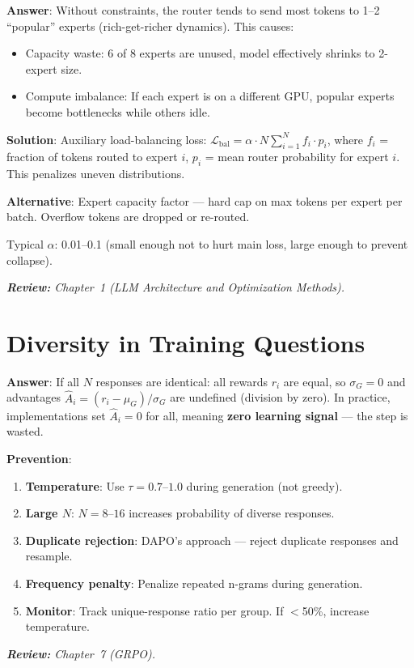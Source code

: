 \begin{questionbox}
\textbf{Answer}: Without constraints, the router tends to send most tokens to 1--2 ``popular'' experts (rich-get-richer dynamics). This causes:

\begin{itemize}
  \item Capacity waste: 6 of 8 experts are unused, model effectively shrinks to 2-expert size.
  \item Compute imbalance: If each expert is on a different GPU, popular experts become bottlenecks while others idle.
\end{itemize}

\textbf{Solution}: Auxiliary load-balancing loss: $\mathcal{L}_{\text{bal}} = \alpha \cdot N \sum_{i=1}^N f_i \cdot p_i$, where $f_i$ = fraction of tokens routed to expert $i$, $p_i$ = mean router probability for expert $i$. This penalizes uneven distributions.

\textbf{Alternative}: Expert capacity factor --- hard cap on max tokens per expert per batch. Overflow tokens are dropped or re-routed.

Typical $\alpha$: 0.01--0.1 (small enough not to hurt main loss, large enough to prevent collapse).

\emph{\textbf{Review:} Chapter~1 (LLM Architecture and Optimization Methods).}
\end{questionbox}

\section{Diversity in Training Questions}
\label{diversity-in-training-questions}

\begin{questionbox}
\textbf{Answer}: If all $N$ responses are identical: all rewards $r_i$ are equal, so $\sigma_G = 0$ and advantages $\hat{A}_i = (r_i - \mu_G)/\sigma_G$ are undefined (division by zero). In practice, implementations set $\hat{A}_i = 0$ for all, meaning \textbf{zero learning signal} --- the step is wasted.

\textbf{Prevention}:

\begin{enumerate}
  \item \textbf{Temperature}: Use $\tau = 0.7$--$1.0$ during generation (not greedy).
  \item \textbf{Large $N$}: $N=8$--$16$ increases probability of diverse responses.
  \item \textbf{Duplicate rejection}: DAPO’s approach --- reject duplicate responses and resample.
  \item \textbf{Frequency penalty}: Penalize repeated n-grams during generation.
  \item \textbf{Monitor}: Track unique-response ratio per group. If $<$50\%, increase temperature.
\end{enumerate}

\emph{\textbf{Review:} Chapter~7 (GRPO).}
\end{questionbox}

